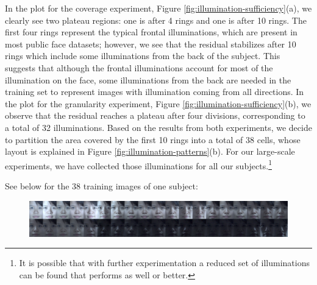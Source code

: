 \documentclass[12pt,journal,draftcls,letterpaper,onecolumn]{IEEEtran}
\begin{document}
 In the plot for the
coverage experiment, Figure \ref{fig:illumination-sufficiency}(a),
 we clearly see two plateau regions: one is after 4 rings
and one is after 10 rings. The first four rings represent the
typical frontal illuminations, which are present in most public
face datasets; however, we see that the residual stabilizes
after 10 rings which include some illuminations from the back
of the subject. This suggests that although the frontal
illuminations account for most of the illumination on the face,
some illuminations from the back are needed in the training set to
represent images with illumination coming from all directions.
In the plot for the granularity experiment, Figure
\ref{fig:illumination-sufficiency}(b), we observe that the
residual reaches a plateau after four divisions, corresponding
to a total of 32 illuminations. Based on the results from both
experiments, we decide to partition the area covered by the
first 10 rings into a total of 38 cells, whose layout is
explained in Figure \ref{fig:illumination-patterns}(b). For
our large-scale experiments, we have collected those
illuminations for all our subjects.\footnote{It is possible
that with further experimentation a reduced set of illuminations
can be found that performs as well or better.}

See below for the 38 training images of one subject:
\begin{figure}[h]
\centering
\includegraphics[width=6.3in]{figures_cvpr/training.png}
\vspace{-.3in}
\end{figure}
\end{document}
